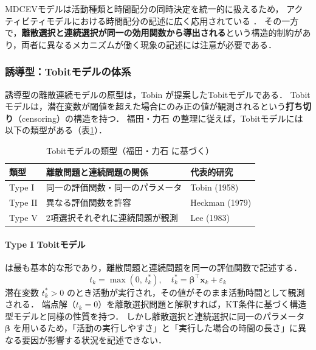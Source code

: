 MDCEVモデルは活動種類と時間配分の同時決定を統一的に扱えるため，
アクティビティモデルにおける時間配分の記述に広く応用されている \cite{BHAT2008274, habib2011random}．
その一方で，\textbf{離散選択と連続選択が同一の効用関数から導出される}という構造的制約があり，両者に異なるメカニズムが働く現象の記述には注意が必要である．

\subsubsection{誘導型：Tobitモデルの体系}\label{sssec:tobit_family}

誘導型の離散連続モデルの原型は，Tobin \cite{Tobin1958} が提案したTobitモデルである．
Tobitモデルは，潜在変数が閾値を超えた場合にのみ正の値が観測されるという\textbf{打ち切り}（censoring）の構造を持つ．
福田・力石 \cite{FukudaChikaraishi2013} の整理に従えば，Tobitモデルには以下の類型がある（表\ref{tab:tobit_types}）．

\begin{table}[htb]
\centering
\caption{Tobitモデルの類型（福田・力石 \cite{FukudaChikaraishi2013} に基づく）}
\label{tab:tobit_types}
\begin{tabular}{l l l}
\hline
類型 & 離散問題と連続問題の関係 & 代表的研究 \\
\hline
Type I  & 同一の評価関数・同一のパラメータ & Tobin (1958) \cite{Tobin1958} \\
Type II & 異なる評価関数を許容 & Heckman (1979) \cite{Heckman1979} \\
Type V  & 2項選択それぞれに連続問題が観測 & Lee (1983) \\
\hline
\end{tabular}
\end{table}

\paragraph{Type I Tobitモデル}は最も基本的な形であり，離散問題と連続問題を同一の評価関数で記述する．
\begin{equation}\label{eq:tobit_typeI}
  t_k = \max(0, \, t_k^*), \quad t_k^* = \bm{\beta}^\top \bm{x}_k + \varepsilon_k
\end{equation}
潜在変数 $t_k^* > 0$ のとき活動が実行され，その値がそのまま活動時間として観測される．
端点解（$t_k = 0$）を離散選択問題と解釈すれば，KT条件に基づく構造型モデルと同様の性質を持つ．
しかし離散選択と連続選択に同一のパラメータ $\bm{\beta}$ を用いるため，「活動の実行しやすさ」と「実行した場合の時間の長さ」に異なる要因が影響する状況を記述できない．


